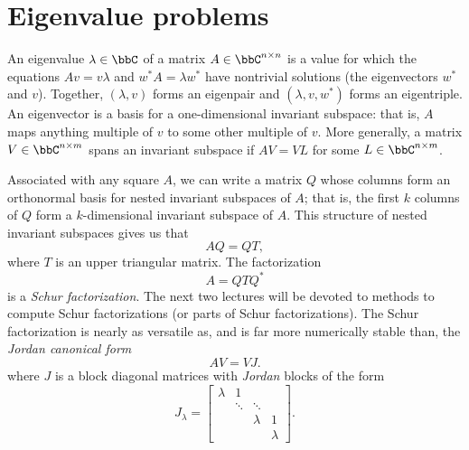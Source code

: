 \documentclass[12pt, leqno]{article} %
\begin{document}

\section{Eigenvalue problems}

An eigenvalue $\lambda \in \bbC$ of a matrix $A \in \bbC^{n \times n}$
is a value for which the equations $A v = v \lambda$ and $w^* A = \lambda w^*$
have nontrivial
solutions (the eigenvectors $w^*$ and $v$).  Together, $(\lambda, v)$ forms an
eigenpair and $(\lambda, v, w^*)$ forms an eigentriple.
An eigenvector is a basis for a one-dimensional invariant
subspace: that is, $A$ maps anything multiple of $v$ to some other
multiple of $v$.  More generally, a matrix $V \in \bbC^{n \times m}$
spans an invariant subspace if $AV = VL$ for some
$L \in \bbC^{n \times m}$.

Associated with any square $A$, we can write a matrix $Q$ whose
columns form an orthonormal basis for nested invariant subspaces of
$A$; that is, the first $k$ columns of $Q$ form a $k$-dimensional
invariant subspace of $A$.  This structure of nested invariant
subspaces gives us that
\[
  AQ = QT,
\]
where $T$ is an upper triangular matrix.  The factorization
\[
  A = QTQ^*
\]
is a {\em Schur factorization}.  The next two lectures will be devoted to
methods to compute Schur factorizations (or parts of Schur
factorizations).  The Schur factorization is nearly as versatile as,
and is far more numerically stable than, the {\em Jordan canonical form}
\[
  A V = V J.
\]
where $J$ is a block diagonal matrices with
{\em Jordan} blocks of the form
\[
  J_{\lambda} =
  \begin{bmatrix}
    \lambda & 1  \\
            & \ddots & \ddots \\
            &        & \lambda & 1 \\
            &        &         & \lambda
  \end{bmatrix}.
\]
\end{document}
